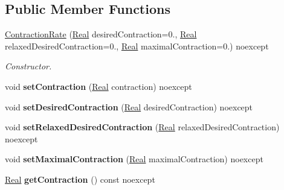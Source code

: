 \subsection*{\-Public \-Member \-Functions}
\begin{DoxyCompactItemize}
\item 
\hyperlink{classSpacy_1_1Mixin_1_1ContractionRate_a3d6b03823ce3951bafd51ceaac732bf7}{\-Contraction\-Rate} (\hyperlink{classSpacy_1_1Real}{\-Real} desired\-Contraction=0., \hyperlink{classSpacy_1_1Real}{\-Real} relaxed\-Desired\-Contraction=0., \hyperlink{classSpacy_1_1Real}{\-Real} maximal\-Contraction=0.) noexcept
\begin{DoxyCompactList}\small\item\em \-Constructor. \end{DoxyCompactList}\item 
\hypertarget{classSpacy_1_1Mixin_1_1ContractionRate_ab9215981f0454bd5d641abad582e64e5}{void {\bfseries set\-Contraction} (\hyperlink{classSpacy_1_1Real}{\-Real} contraction) noexcept}\label{classSpacy_1_1Mixin_1_1ContractionRate_ab9215981f0454bd5d641abad582e64e5}

\item 
\hypertarget{classSpacy_1_1Mixin_1_1ContractionRate_a26eaa6344b5b2191931a9fd87ed96f39}{void {\bfseries set\-Desired\-Contraction} (\hyperlink{classSpacy_1_1Real}{\-Real} desired\-Contraction) noexcept}\label{classSpacy_1_1Mixin_1_1ContractionRate_a26eaa6344b5b2191931a9fd87ed96f39}

\item 
\hypertarget{classSpacy_1_1Mixin_1_1ContractionRate_ac6e47c0ab683643fea7490703f02632d}{void {\bfseries set\-Relaxed\-Desired\-Contraction} (\hyperlink{classSpacy_1_1Real}{\-Real} relaxed\-Desired\-Contraction) noexcept}\label{classSpacy_1_1Mixin_1_1ContractionRate_ac6e47c0ab683643fea7490703f02632d}

\item 
\hypertarget{classSpacy_1_1Mixin_1_1ContractionRate_acc99ba536cd9a027baa50a1412d9d216}{void {\bfseries set\-Maximal\-Contraction} (\hyperlink{classSpacy_1_1Real}{\-Real} maximal\-Contraction) noexcept}\label{classSpacy_1_1Mixin_1_1ContractionRate_acc99ba536cd9a027baa50a1412d9d216}

\item 
\hypertarget{classSpacy_1_1Mixin_1_1ContractionRate_a49a83927f070d2dd600966f491f1f304}{\hyperlink{classSpacy_1_1Real}{\-Real} {\bfseries get\-Contraction} () const noexcept}\label{classSpacy_1_1Mixin_1_1ContractionRate_a49a83927f070d2dd600966f491f1f304}


\end{DoxyCompactItemize}
